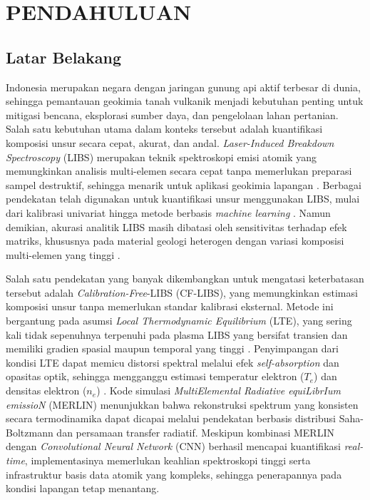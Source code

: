 
\chapter{PENDAHULUAN}

\section{Latar Belakang}
Indonesia merupakan negara dengan jaringan gunung api aktif terbesar di dunia, sehingga pemantauan geokimia tanah vulkanik menjadi kebutuhan penting untuk mitigasi bencana, eksplorasi sumber daya, dan pengelolaan lahan pertanian. Salah satu kebutuhan utama dalam konteks tersebut adalah kuantifikasi komposisi unsur secara cepat, akurat, dan andal. \textit{Laser-Induced Breakdown Spectroscopy} (LIBS) merupakan teknik spektroskopi emisi atomik yang memungkinkan analisis multi-elemen secara cepat tanpa memerlukan preparasi sampel destruktif, sehingga menarik untuk aplikasi geokimia lapangan \citep{legnaioli_laser-induced_2025, sawyers_database_2025}. Berbagai pendekatan telah digunakan untuk kuantifikasi unsur menggunakan LIBS, mulai dari kalibrasi univariat hingga metode berbasis \textit{machine learning} \citep{zhang_improving_2025, babos_laser-induced_2024}. Namun demikian, akurasi analitik LIBS masih dibatasi oleh sensitivitas terhadap efek matriks, khususnya pada material geologi heterogen dengan variasi komposisi multi-elemen yang tinggi \citep{hao_machine_2024}.

Salah satu pendekatan yang banyak dikembangkan untuk mengatasi keterbatasan tersebut adalah \textit{Calibration-Free}-LIBS (CF-LIBS), yang memungkinkan estimasi komposisi unsur tanpa memerlukan standar kalibrasi eksternal. Metode ini bergantung pada asumsi \textit{Local Thermodynamic Equilibrium} (LTE), yang sering kali tidak sepenuhnya terpenuhi pada plasma LIBS yang bersifat transien dan memiliki gradien spasial maupun temporal yang tinggi \citep{cristoforetti_local_2010, zaitsev_two-zone_2024}. Penyimpangan dari kondisi LTE dapat memicu distorsi spektral melalui efek \textit{self-absorption} dan opasitas optik, sehingga mengganggu estimasi temperatur elektron ($T_e$) dan densitas elektron ($n_e$) \citep{tang_review_2024}. Kode simulasi \textit{MultiElemental Radiative equiLibrIum emissioN} (MERLIN) \citep{favre_merlin_2025} menunjukkan bahwa rekonstruksi spektrum yang konsisten secara termodinamika dapat dicapai melalui pendekatan berbasis distribusi Saha-Boltzmann dan persamaan transfer radiatif. Meskipun kombinasi MERLIN dengan \textit{Convolutional Neural Network} (CNN) berhasil mencapai kuantifikasi \textit{real-time}, implementasinya memerlukan keahlian spektroskopi tinggi serta infrastruktur basis data atomik yang kompleks, sehingga penerapannya pada kondisi lapangan tetap menantang.

